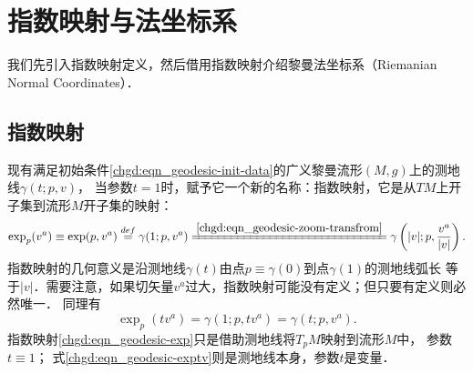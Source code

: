  

\section{指数映射与法坐标系}\label{chgd:sec_exp-RNC}
我们先引入指数映射定义，然后借用指数映射介绍黎曼法坐标系（Riemanian Normal Coordinates）．

\subsection{指数映射}\label{chgd:sec_exp}
现有满足初始条件\eqref{chgd:eqn_geodesic-init-data}的广义黎曼流形$(M,g)$上的测地线$\gamma(t;p,v)$，
当参数$t=1$时，赋予它一个新的名称：{\heiti 指数映射}，它是从$TM$上开子集到流形$M$开子集的映射：
\begin{equation}\label{chgd:eqn_geodesic-exp}
    \exp_p(v^a)\equiv\exp(p,v^a)\overset{def}{=}\gamma(1;p,v^a)
    \xlongequal{\ref{chgd:eqn_geodesic-zoom-transfrom}}\gamma\left(|v|;p,\frac{v^a}{|v|}\right).
\end{equation}
指数映射的几何意义是沿测地线$\gamma(t)$由点$p\equiv \gamma(0)$到点$\gamma(1)$的测地线弧长
等于$|v|$．需要注意，如果切矢量$v^a$过大，指数映射可能没有定义；但只要有定义则必然唯一．
同理有
\begin{equation}\label{chgd:eqn_geodesic-exptv}
    \exp_p(t v^a)=\gamma(1;p,t v^a)=\gamma(t;p,v^a).
\end{equation}
指数映射\eqref{chgd:eqn_geodesic-exp}只是借助测地线将$T_pM$映射到流形$M$中，
参数$t\equiv 1$；
式\eqref{chgd:eqn_geodesic-exptv}则是测地线本身，参数$t$是变量．


